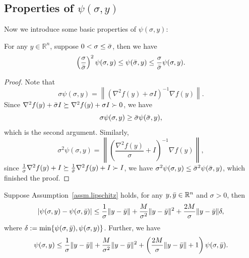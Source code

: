 \documentclass{article}
\begin{document}
\subsection*{Properties of $\psi(\sigma,y)$}
Now we introduce some basic properties of $\psi(\sigma,y)$:
\begin{lemma}
    \label{lem.psi property wrt sigma}
    For any $y\in\mathbb{R}^n$, suppose $0<\sigma\leq \Bar{\sigma}$, then we have
    \begin{equation}
        \label{eq.psi property wrt sigma}
        \left(\frac{\sigma}{\Bar{\sigma}}\right)^2 \psi(\sigma,y)\leq \psi(\Bar{\sigma},y) \leq \frac{\sigma}{\Bar{\sigma}}\psi(\sigma,y).
    \end{equation}
\end{lemma}
\begin{proof}
    Note that
    \begin{equation*}
        \sigma \psi(\sigma,y) = \left \| \left(\nabla^2 f(y)+\sigma I \right)^{-1}\nabla f(y)\right \|.
    \end{equation*}
    Since $\nabla^2 f(y)+\Bar{\sigma} I\succeq \nabla^2 f(y)+\sigma I \succ 0$, we have
    \begin{equation*}
        \sigma \psi(\sigma,y) \geq \Bar{\sigma} \psi(\Bar{\sigma},y),
    \end{equation*}
    which is the second argument. Similarly,
    \begin{equation*}
        \sigma^2 \psi(\sigma,y) = \left \| \left(\frac{\nabla^2 f(y)}{\sigma}+ I \right)^{-1}\nabla f(y)\right \|,
    \end{equation*}
    since $\frac{1}{\sigma}\nabla^2 f(y)+I\succeq \frac{1}{\Bar{\sigma}}\nabla^2 f(y)+I\succ I$, we have $\sigma^2 \psi(\sigma,y)\leq \Bar{\sigma}^2 \psi(\Bar{\sigma},y)$, which finished the proof.
\end{proof}
\begin{lemma}
    \label{lem.psi property wrt y}
    Suppose Assumption~\ref{assm.lipschitz} holds, for any $y,\Bar{y} \in \mathbb{R}^n$ and $\sigma>0$, then
    \begin{equation}
        \label{eq.psi property wrt y}
        \left \vert \psi(\sigma,y)-\psi(\sigma,\Bar{y}) \right\vert \leq \frac{1}{\sigma}\|y-\Bar{y}\| +\frac{M}{\sigma^2}\|y-\Bar{y}\|^2 +\frac{2M}{\sigma}\|y-\Bar{y}\|\delta,
    \end{equation}
    where $\delta:=\min\{\psi(\sigma,\Bar{y}),\psi(\sigma,y)\}$. Further, we have
    \begin{equation}
        \label{eq.psi property wrt y advanced}
        \psi(\sigma,y) \leq \frac{1}{\sigma}\|y-\Bar{y}\| +\frac{M}{\sigma^2}\|y-\Bar{y}\|^2 +\left(\frac{2M}{\sigma}\|y-\Bar{y}\|+1\right)\psi(\sigma,\Bar{y}).
    \end{equation}
\end{lemma}
\end{document}
